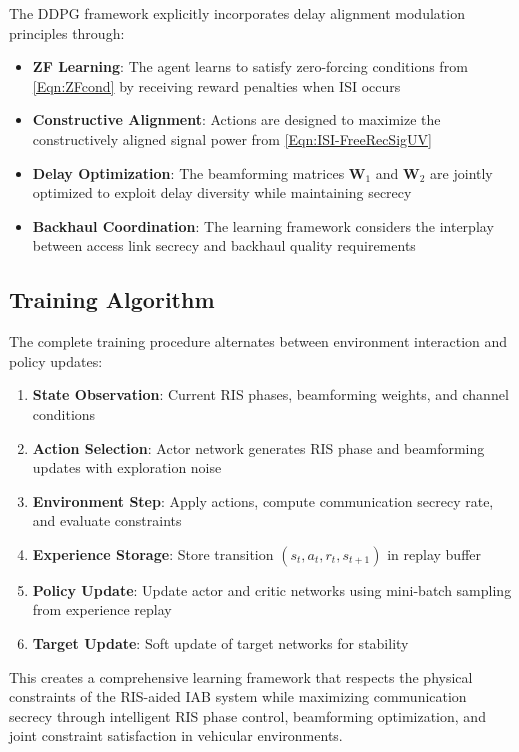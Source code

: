 The DDPG framework explicitly incorporates delay alignment modulation principles through:
\begin{itemize}
\item \textbf{ZF Learning}: The agent learns to satisfy zero-forcing conditions from \eqref{Eqn:ZFcond} by receiving reward penalties when ISI occurs
\item \textbf{Constructive Alignment}: Actions are designed to maximize the constructively aligned signal power from \eqref{Eqn:ISI-FreeRecSigUV}
\item \textbf{Delay Optimization}: The beamforming matrices $\mathbf{W}_1$ and $\mathbf{W}_2$ are jointly optimized to exploit delay diversity while maintaining secrecy
\item \textbf{Backhaul Coordination}: The learning framework considers the interplay between access link secrecy and backhaul quality requirements
\end{itemize}

\subsection{Training Algorithm}

The complete training procedure alternates between environment interaction and policy updates:

\begin{enumerate}
\item \textbf{State Observation}: Current RIS phases, beamforming weights, and channel conditions
\item \textbf{Action Selection}: Actor network generates RIS phase and beamforming updates with exploration noise
\item \textbf{Environment Step}: Apply actions, compute communication secrecy rate, and evaluate constraints
\item \textbf{Experience Storage}: Store transition $(s_t, a_t, r_t, s_{t+1})$ in replay buffer
\item \textbf{Policy Update}: Update actor and critic networks using mini-batch sampling from experience replay
\item \textbf{Target Update}: Soft update of target networks for stability
\end{enumerate}

This creates a comprehensive learning framework that respects the physical constraints of the RIS-aided IAB system while maximizing communication secrecy through intelligent RIS phase control, beamforming optimization, and joint constraint satisfaction in vehicular environments.
